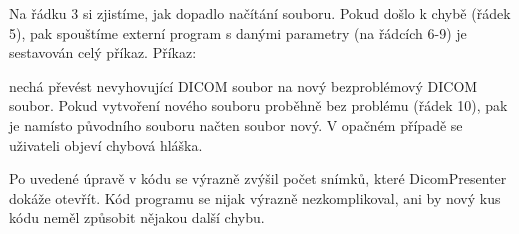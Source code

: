 Na řádku 3 si zjistíme, jak dopadlo načítání souboru. Pokud došlo k chybě (řádek 5), pak spouštíme externí program  s danými parametry (na řádcích 6-9) je sestavován celý příkaz. Příkaz:


nechá převést nevyhovující DICOM soubor na nový bezproblémový DICOM soubor. Pokud vytvoření nového souboru proběhně bez problému (řádek 10), pak je namísto původního souboru načten soubor nový. V opačném případě se uživateli objeví chybová hláška.

Po uvedené úpravě v kódu se výrazně zvýšil počet snímků, které DicomPresenter dokáže otevřít. Kód programu se nijak výrazně nezkomplikoval, ani by nový kus kódu neměl způsobit nějakou další chybu.



